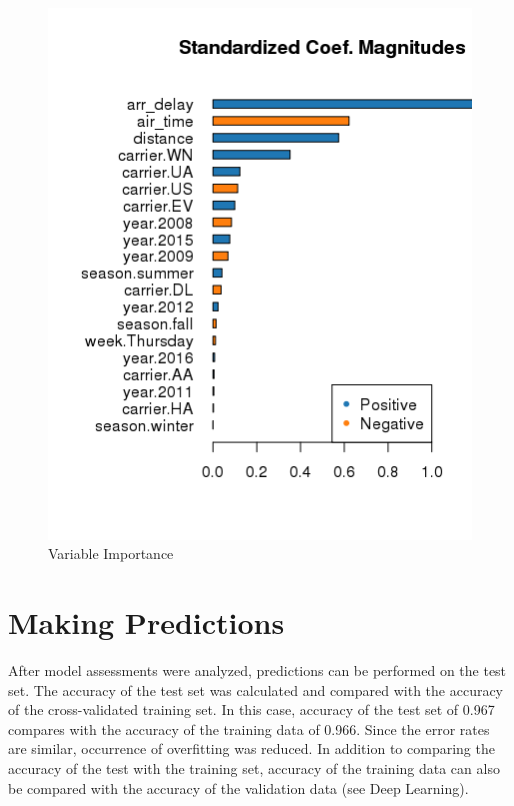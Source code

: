 \documentclass[12pt,twoside]{amherstthesis}
\begin{document}
  \begin{Shaded}
  \begin{Highlighting}[]
  \end{Highlighting}
  \end{Shaded}
  
  \begin{figure}[htbp]
  \centering
  \includegraphics[scale = 1,angle = 0]{figure/VarImpPlot-3.png}
  \caption[Variable Importance]{\normalsize{Variable Importance}}
  \label{fig:Hyarn34}
  \end{figure}
  
  \clearpage
  
  \section{Making Predictions}\label{making-predictions}
  
  After model assessments were analyzed, predictions can be performed on
  the test set. The accuracy of the test set was calculated and compared
  with the accuracy of the cross-validated training set. In this case,
  accuracy of the test set of 0.967 compares with the accuracy of the
  training data of 0.966. Since the error rates are similar, occurrence of
  overfitting was reduced. In addition to comparing the accuracy of the
  test with the training set, accuracy of the training data can also be
  compared with the accuracy of the validation data (see Deep Learning).
  
\end{document}
